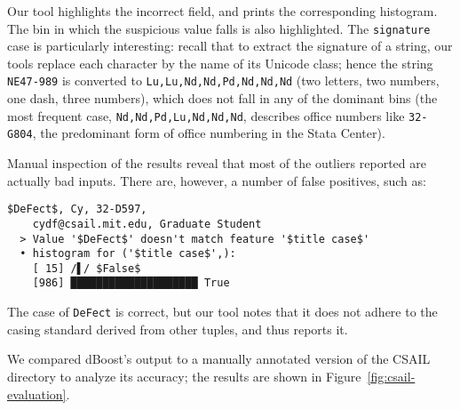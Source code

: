 Our tool highlights the incorrect field, and prints the corresponding histogram. The bin in which the suspicious value falls is also highlighted. The \texttt{signature} case is particularly interesting: recall that to extract the signature of a string, our tools replace each character by the name of its Unicode class; hence the string \texttt{NE47-989} is converted to \lstinline{Lu,Lu,Nd,Nd,Pd,Nd,Nd,Nd} (two letters, two numbers, one dash, three numbers), which does not fall in any of the dominant bins (the most frequent case, \lstinline{Nd,Nd,Pd,Lu,Nd,Nd,Nd}, describes office numbers like \lstinline{32-G804}, the predominant form of office numbering in the Stata Center).

Manual inspection of the results reveal that most of the outliers reported are actually bad inputs. There are, however, a number of false positives, such as:

\begin{lstlisting}[gobble=2]
  $DeFect$, Cy, 32-D597,
    cydf@csail.mit.edu, Graduate Student
  > Value '$DeFect$' doesn't match feature '$title case$'
  • histogram for ('$title case$',):
    [ 15] /▌/ $False$
    [986] ████████████████████ True
\end{lstlisting}

The case of \lstinline{DeFect} is correct, but our tool notes that it does not adhere to the casing standard derived from other tuples, and thus reports it.

We compared dBoost's output to a manually annotated version of the CSAIL directory to analyze its accuracy; the results are shown in Figure~\ref{fig:csail-evaluation}.